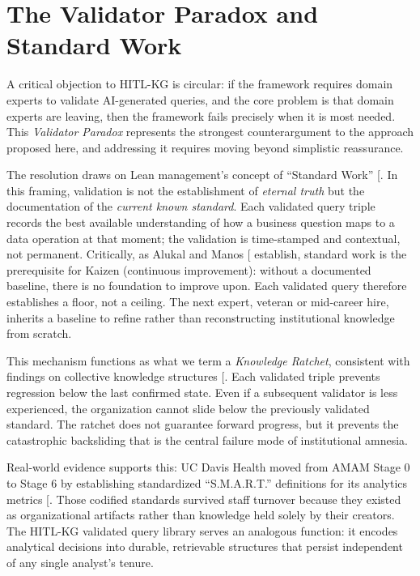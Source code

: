 \documentclass[
  american,
  11pt,
  letterpaper,
  oneside  ,captions=tableheading
]{scrartcl}
\begin{document}
\section{The Validator Paradox and Standard
Work}\label{the-validator-paradox-and-standard-work}

A critical objection to HITL-KG is circular: if the framework requires
domain experts to validate AI-generated queries, and the core problem is
that domain experts are leaving, then the framework fails precisely when
it is most needed. This \emph{Validator Paradox} represents the
strongest counterargument to the approach proposed here, and addressing
it requires moving beyond simplistic reassurance.

The resolution draws on Lean management's concept of ``Standard Work''
{[}\citeproc{ref-alukal2006}{71}{]}. In this framing, validation is not
the establishment of \emph{eternal truth} but the documentation of the
\emph{current known standard}. Each validated query triple records the
best available understanding of how a business question maps to a data
operation at that moment; the validation is time-stamped and contextual,
not permanent. Critically, as Alukal and Manos
{[}\citeproc{ref-alukal2006}{71}{]} establish, standard work is the
prerequisite for Kaizen (continuous improvement): without a documented
baseline, there is no foundation to improve upon. Each validated query
therefore establishes a floor, not a ceiling. The next expert, veteran
or mid-career hire, inherits a baseline to refine rather than
reconstructing institutional knowledge from scratch.

This mechanism functions as what we term a \emph{Knowledge Ratchet},
consistent with findings on collective knowledge structures
{[}\citeproc{ref-rao2006}{13}{]}. Each validated triple prevents
regression below the last confirmed state. Even if a subsequent
validator is less experienced, the organization cannot slide below the
previously validated standard. The ratchet does not guarantee forward
progress, but it prevents the catastrophic backsliding that is the
central failure mode of institutional amnesia.

Real-world evidence supports this: UC Davis Health moved from AMAM Stage
0 to Stage 6 by establishing standardized ``S.M.A.R.T.'' definitions for
its analytics metrics {[}\citeproc{ref-himss2025ucdavis}{72}{]}. Those
codified standards survived staff turnover because they existed as
organizational artifacts rather than knowledge held solely by their
creators. The HITL-KG validated query library serves an analogous
function: it encodes analytical decisions into durable, retrievable
structures that persist independent of any single analyst's tenure.
\end{document}
